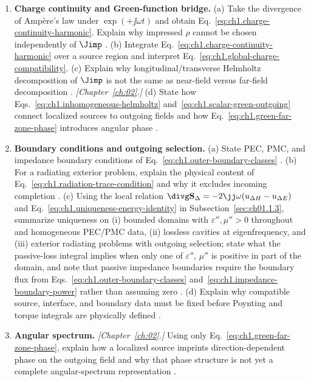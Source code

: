 \begin{enumerate}
\item \textbf{Charge continuity and Green-function bridge.}
(a) Take the divergence of Amp\`ere's law under $\exp(+\jj\omega t)$ and obtain Eq.~\eqref{eq:ch1.charge-continuity-harmonic}. Explain why impressed $\rho$ cannot be chosen independently of $\Jimp$ \cite{maxwell1873,stratton1941}.
(b) Integrate Eq.~\eqref{eq:ch1.charge-continuity-harmonic} over a source region and interpret Eq.~\eqref{eq:ch1.global-charge-compatibility}.
(c) Explain why longitudinal/transverse Helmholtz decomposition of $\Jimp$ is not the same as near-field versus far-field decomposition \cite{stratton1941,jackson1999}. \emph{[Chapter~\ref{ch:02}.]}
(d) State how Eqs.~\eqref{eq:ch1.inhomogeneous-helmholtz} and~\eqref{eq:ch1.scalar-green-outgoing} connect localized sources to outgoing fields and how Eq.~\eqref{eq:ch1.green-far-zone-phase} introduces angular phase \cite{tai1994,stratton1941}.

\item \textbf{Boundary conditions and outgoing selection.}
(a) State PEC, PMC, and impedance boundary conditions of Eq.~\eqref{eq:ch1.outer-boundary-classes} \cite{stratton1941}.
(b) For a radiating exterior problem, explain the physical content of Eq.~\eqref{eq:ch1.radiation-trace-condition} and why it excludes incoming completion \cite{sommerfeld1949,stratton1941}.
(c) Using the local relation $\divg\mathbf{S}_\Delta=-2\jj\omega(u_{\Delta H}-u_{\Delta E})$ and Eq.~\eqref{eq:ch1.uniqueness-energy-identity} in Subsection~\ref{sec:ch01.1.3}, summarize uniqueness on (i) bounded domains with $\varepsilon'',\mu''>0$ throughout and homogeneous PEC/PMC data, (ii) lossless cavities at eigenfrequency, and (iii) exterior radiating problems with outgoing selection; state what the passive-loss integral implies when only one of $\varepsilon''$, $\mu''$ is positive in part of the domain, and note that passive impedance boundaries require the boundary flux from Eqs.~\eqref{eq:ch1.outer-boundary-classes} and~\eqref{eq:ch1.impedance-boundary-power} rather than assuming zero \cite{stratton1941,harrington2001}.
(d) Explain why compatible source, interface, and boundary data must be fixed before Poynting and torque integrals are physically defined \cite{harrington2001}.

\item \textbf{Angular spectrum.}
\emph{[Chapter~\ref{ch:02}.]} Using only Eq.~\eqref{eq:ch1.green-far-zone-phase}, explain how a localized source imprints direction-dependent phase on the outgoing field and why that phase structure is not yet a complete angular-spectrum representation \cite{stratton1941,silver1949}.


\end{enumerate}
